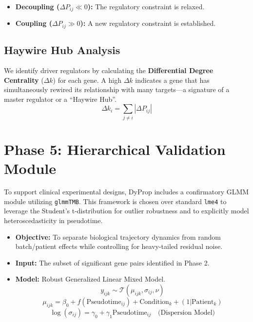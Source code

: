 \documentclass[11pt, a4paper]{article}
\begin{document}
\begin{itemize}
    \item \textbf{Decoupling ($\Delta P_{ij} \ll 0$):} The regulatory constraint is relaxed.
    \item \textbf{Coupling ($\Delta P_{ij} \gg 0$):} A new regulatory constraint is established.
\end{itemize}

\subsection{Haywire Hub Analysis}
We identify driver regulators by calculating the \textbf{Differential Degree Centrality} ($\Delta k$) for each gene. A high $\Delta k$ indicates a gene that has simultaneously rewired its relationship with many targets---a signature of a master regulator or a ``Haywire Hub''.
$$ \Delta k_i = \sum_{j \neq i} |\Delta P_{ij}| $$

\section{Phase 5: Hierarchical Validation Module}

To support clinical experimental designs, DyProp includes a confirmatory GLMM module utilizing \texttt{glmmTMB}. This framework is chosen over standard \texttt{lme4} to leverage the Student's t-distribution for outlier robustness and to explicitly model heteroscedasticity in pseudotime.

\begin{itemize}
    \item \textbf{Objective:} To separate biological trajectory dynamics from random batch/patient effects while controlling for heavy-tailed residual noise.
    \item \textbf{Input:} The subset of significant gene pairs identified in Phase 2.
    \item \textbf{Model:} Robust Generalized Linear Mixed Model.
    $$ y_{ijk} \sim \mathcal{T}(\mu_{ijk}, \sigma_{ij}, \nu) $$
    $$ \mu_{ijk} = \beta_0 + f(\text{Pseudotime}_{ij}) + \text{Condition}_k + (1 | \text{Patient}_k) $$
    $$ \log(\sigma_{ij}) = \gamma_0 + \gamma_1 \text{Pseudotime}_{ij} \quad \text{(Dispersion Model)} $$
\end{itemize}
\end{document}
